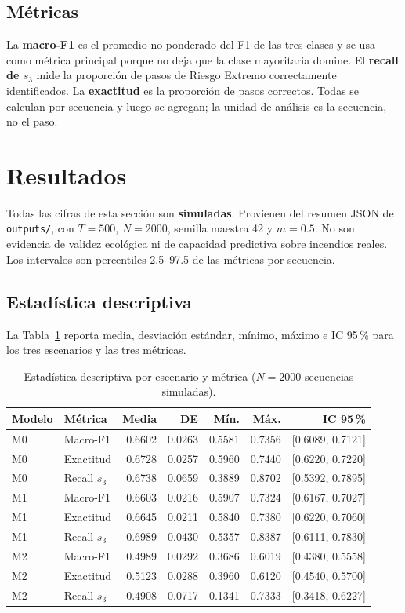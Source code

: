 \documentclass[11pt,letterpaper]{article}
\begin{document}
\subsection{Métricas}

La \textbf{macro-F1} es el promedio no ponderado del F1 de las tres clases y se usa como métrica principal porque no deja que la clase mayoritaria domine. El \textbf{recall de \(s_3\)} mide la proporción de pasos de Riesgo Extremo correctamente identificados. La \textbf{exactitud} es la proporción de pasos correctos. Todas se calculan por secuencia y luego se agregan; la unidad de análisis es la secuencia, no el paso.

\section{Resultados}

Todas las cifras de esta sección son \textbf{simuladas}. Provienen del resumen JSON de \texttt{outputs/}, con \(T=500\), \(N=2000\), semilla maestra 42 y \(m=0.5\). No son evidencia de validez ecológica ni de capacidad predictiva sobre incendios reales. Los intervalos son percentiles 2.5--97.5 de las métricas por secuencia.

\subsection{Estadística descriptiva}

La Tabla~\ref{tab:descriptivos} reporta media, desviación estándar, mínimo, máximo e IC 95\,\% para los tres escenarios y las tres métricas.

\begin{table}[H]
\centering
\caption{Estadística descriptiva por escenario y métrica (\(N=2000\) secuencias simuladas).}
\label{tab:descriptivos}
\small
\setlength{\tabcolsep}{3.5pt}
\begin{tabular}{@{}llrrrrr@{}}
\toprule
Modelo & Métrica & Media & DE & Mín. & Máx. & IC 95\,\%\\
\midrule
M0 & Macro-F1 & 0.6602 & 0.0263 & 0.5581 & 0.7356 & [0.6089, 0.7121]\\
M0 & Exactitud & 0.6728 & 0.0257 & 0.5960 & 0.7440 & [0.6220, 0.7220]\\
M0 & Recall \(s_3\) & 0.6738 & 0.0659 & 0.3889 & 0.8702 & [0.5392, 0.7895]\\
\midrule
M1 & Macro-F1 & 0.6603 & 0.0216 & 0.5907 & 0.7324 & [0.6167, 0.7027]\\
M1 & Exactitud & 0.6645 & 0.0211 & 0.5840 & 0.7380 & [0.6220, 0.7060]\\
M1 & Recall \(s_3\) & 0.6989 & 0.0430 & 0.5357 & 0.8387 & [0.6111, 0.7830]\\
\midrule
M2 & Macro-F1 & 0.4989 & 0.0292 & 0.3686 & 0.6019 & [0.4380, 0.5558]\\
M2 & Exactitud & 0.5123 & 0.0288 & 0.3960 & 0.6120 & [0.4540, 0.5700]\\
M2 & Recall \(s_3\) & 0.4908 & 0.0717 & 0.1341 & 0.7333 & [0.3418, 0.6227]\\
\bottomrule
\end{tabular}
\end{table}
\end{document}
